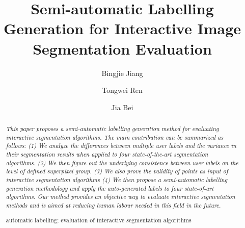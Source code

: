 \documentclass[runningheads,a4paper]{llncs}
\newcommand{\keywords}[1]{\par\addvspace\baselineskip
\noindent\keywordname\enspace\ignorespaces#1}
\begin{document}
\mainmatter  %

\title{Semi-automatic Labelling Generation for Interactive Image Segmentation Evaluation}


%
%
\author{Bingjie Jiang \and Tongwei Ren \and Jia Bei}
%


\maketitle


\begin{abstract}
\emph{This paper proposes a semi-automatic labelling generation method for evaluating interactive segmentation algorithms. The main contribution can be summarized as follows: (1) We analyze the differences between multiple user labels and the variance in their segmentation results when applied to four state-of-the-art segmentation algorithms. (2) We then figure out the underlying consistence between user labels on the level of defined superpixel group. (3) We also prove the validity of points as input of interactive segmentation algorithms (4) We then propose a semi-automatic labelling generation methodology and apply the auto-generated labels to four state-of-art algorithms. Our method provides an objective way to evaluate interactive segmentation methods and is aimed at reducing human labour needed in this field in the future.
}

\keywords{automatic labelling; evaluation of interactive segmentation algorithms}
\end{abstract}
\end{document}
